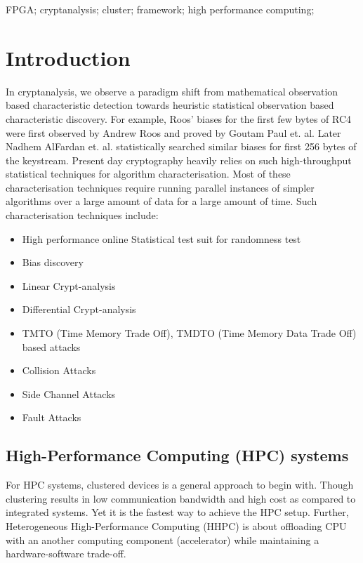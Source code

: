 \documentclass[10pt, conference, compsocconf]{IEEEtran}
\begin{document}
\begin{IEEEkeywords}
FPGA; cryptanalysis; cluster; framework; high performance computing; 

\end{IEEEkeywords}


%
\IEEEpeerreviewmaketitle

\section{Introduction}

In cryptanalysis, we observe a paradigm shift from mathematical observation based characteristic detection towards heuristic statistical observation based characteristic discovery. For example, Roos’ biases for the first few bytes of RC4 were first observed by Andrew Roos and proved by Goutam Paul et. al.\cite{paul2008non} Later Nadhem AlFardan et. al.\cite{alfardan2013security} statistically searched similar biases for first 256 bytes of the keystream. Present day cryptography heavily relies on such high-throughput statistical techniques for algorithm characterisation. Most of these characterisation techniques require running parallel instances of simpler algorithms over a large amount of data for a large amount of time. Such characterisation techniques include:

\begin{itemize}
  \item High performance online Statistical test suit for randomness test
  \item Bias discovery
  \item Linear Crypt-analysis
  \item Differential Crypt-analysis
  \item TMTO (Time Memory Trade Off), TMDTO (Time Memory Data Trade Off) based attacks
  \item Collision Attacks
  \item Side Channel Attacks
  \item Fault Attacks
\end{itemize}

\subsection{High-Performance Computing (HPC) systems}
For HPC systems, clustered devices is a general approach to begin with. Though clustering results in low communication bandwidth and high cost as compared to integrated systems. Yet it is the fastest way to achieve the HPC setup. Further, Heterogeneous High-Performance Computing (HHPC) is about offloading CPU with an another computing component (accelerator) while maintaining a hardware-software trade-off.
\end{document}
